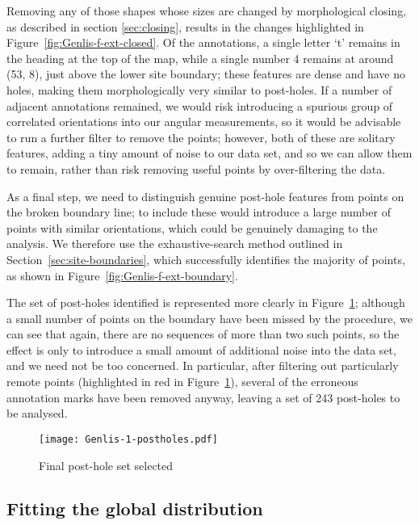 \documentclass[../../ArchStats.tex]{subfiles}
\begin{document}
Removing any of those shapes whose sizes are changed by morphological closing, as described in section \ref{sec:closing}, results in the changes highlighted in Figure~\ref{fig:Genlis-f-ext-closed}. Of the annotations, a single letter `t' remains in the heading at the top of the map, while a single number 4 remains at around (53, 8), just above the lower site boundary; these features are dense and have no holes, making them morphologically very similar to post-holes. If a number of adjacent annotations remained, we would risk introducing a spurious group of correlated orientations into our angular measurements, so it would be advisable to run a further filter to remove the points; however, both of these are solitary features, adding a tiny amount of noise to our data set, and so we can allow them to remain, rather than risk removing useful points by over-filtering the data.

As a final step, we need to distinguish genuine post-hole features from points on the broken boundary line; to include these would introduce a large number of points with similar orientations, which could be genuinely damaging to the analysis. We therefore use the exhaustive-search method outlined in Section~\ref{sec:site-boundaries}, which successfully identifies the majority of points, as shown in Figure~\ref{fig:Genlis-f-ext-boundary}. 

The set of post-holes identified is represented more clearly in Figure~\ref{fig:Genlis-f-ext-postholes}; although a small number of points on the boundary have been missed by the procedure, we can see that again, there are no sequences of more than two such points, so the effect is only to introduce a small amount of additional noise into the data set, and we need not be too concerned. In particular, after filtering out particularly remote points (highlighted in red in Figure~\ref{fig:Genlis-f-ext-postholes}), several of the erroneous annotation marks have been removed anyway, leaving a set of 243 post-holes to be analysed.

\begin{figure}[!ht]
\caption{Final post-hole set selected}
\label{fig:Genlis-f-ext-postholes}
\centering
\texttt{[image: Genlis-1-postholes.pdf]}
\end{figure}




\subsection{Fitting the global distribution}
\end{document}
